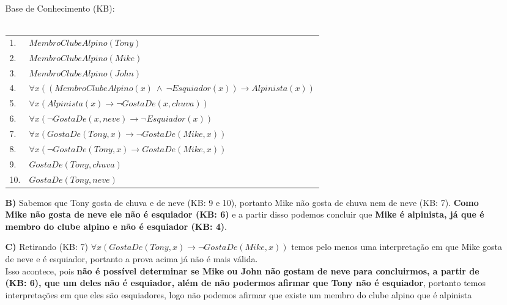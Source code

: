\documentclass[12pt]{article}
\begin{document}
\begin{itemize}
\begin{itemize}
					\begin{center}
						Base de Conhecimento (KB):\\ \hfill \\
						\begin{tabular}{l|l}
							1. & $MembroClubeAlpino(Tony)$\\
							2. & $MembroClubeAlpino(Mike)$\\
							3. & $MembroClubeAlpino(John)$\\
							4. & $\forall x ((MembroClubeAlpino(x) \ \wedge \ \neg Esquiador(x)) 
							\rightarrow Alpinista(x)) $ \\
							5. & $\forall x (Alpinista(x) \rightarrow \neg GostaDe(x, chuva)) $\\
							6. & $\forall x (\neg GostaDe(x, neve) \rightarrow \neg Esquiador(x))$\\
							7. & $\forall x (GostaDe(Tony, x) \rightarrow \neg GostaDe(Mike, x))$\\
							8. & $\forall x (\neg GostaDe(Tony, x) \rightarrow GostaDe(Mike, x))$\\
							9. & $GostaDe(Tony, chuva)$\\
							10. & $GostaDe(Tony, neve)$\\			
						\end{tabular}
					\end{center}
				\item[\textbf{B) }]
					\hfill\newline
					Sabemos que Tony gosta de chuva e de neve (KB: 9 e 10), portanto
					Mike não gosta de chuva nem de neve (KB: 7). \textbf{Como Mike não gosta
					de neve ele não é esquiador (KB: 6)} e a partir disso podemos
					concluir que \textbf{Mike é alpinista, já que é membro do clube alpino e
					não é esquiador (KB: 4)}.
				\newpage
				\item[\textbf{C) }]
					\hfill\newline	
					Retirando (KB: 7)  $\forall x (GostaDe(Tony, x) \rightarrow \neg GostaDe(Mike, 
					x))$ temos pelo menos uma interpretação em que Mike gosta de neve
					e é esquiador, portanto a prova acima já não é mais válida.\\
					Isso acontece, pois \textbf{não é possível determinar se Mike ou John não gostam 
					de neve para concluirmos, a partir de (KB: 6), que um deles não é
					esquiador, além de não podermos afirmar que Tony não é esquiador}, portanto 
					temos interpretações em que eles são esquiadores,
					logo não podemos afirmar que existe um membro do clube alpino que é alpinista 

\end{itemize}
\end{itemize}
\end{document}
